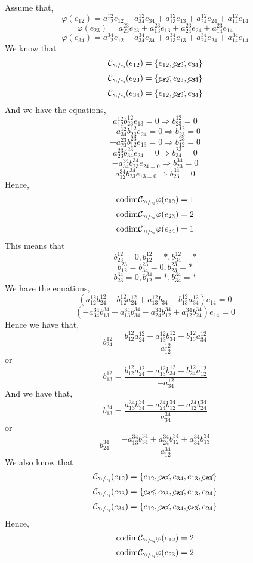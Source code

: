 \documentclass{article}
\begin{document}
Assume that,
\[\varphi(e_{12})= a_{12}^{12}e_{12}+a_{34}^{12}e_{34}+a_{13}^{12}e_{13}+a_{24}^{12}e_{24}+a_{14}^{12}e_{14}\]
\[\varphi(e_{23})= a_{23}^{23}e_{23}+a_{13}^{23}e_{13}+a_{24}^{23}e_{24}+a_{14}^{23}e_{14}\]
\[\varphi(e_{34})= a_{12}^{34}e_{12}+a_{34}^{34}e_{34}+a_{13}^{34}e_{13}+a_{24}^{34}e_{24}+a_{14}^{34}e_{14}\]
We know that
\[\mathcal{C}_{\sfrac{\gamma_1}{\gamma_3}}(e_{12})=\{e_{12},\cancel{e_{23}},e_{34}\}\]
\[\mathcal{C}_{\sfrac{\gamma_1}{\gamma_3}}(e_{23})=\{\cancel{e_{12}},e_{23},\cancel{e_{34}}\}\]
\[\mathcal{C}_{\sfrac{\gamma_1}{\gamma_3}}(e_{34})=\{e_{12},\cancel{e_{23}},e_{34}\}\]
And we have the equations,
\[a_{12}^{12}b_{23}^{12}e_{13}=0\Rightarrow b_{23}^{12}=0\]
\[-a_{34}^{12}b_{23}^{12}e_{24}=0\Rightarrow b_{23}^{12}=0\]
\[-a_{23}^{23}b_{12}^{23}e_{13}=0\Rightarrow b_{12}^{23}=0\]
\[a_{23}^{23}b_{34}^{23}e_{24}=0\Rightarrow b_{34}^{23}=0\]
\[-a_{34}^{34}b_{23}^{34}e_{24=0}\Rightarrow b_{23}^{34}=0\]
\[a_{12}^{34}b_{23}^{34}e_{13=0}\Rightarrow b_{23}^{34}=0\]
Hence,
\[\mathrm{codim}\mathcal{C}_{\sfrac{\gamma_1}{\gamma_3}}\varphi(e_{12})=1\]
\[\mathrm{codim}\mathcal{C}_{\sfrac{\gamma_1}{\gamma_3}}\varphi(e_{23})=2\]
\[\mathrm{codim}\mathcal{C}_{\sfrac{\gamma_1}{\gamma_3}}\varphi(e_{34})=1\]
This means that
\[ b_{23}^{12}=0, b_{12}^{12}=*, b_{34}^{12}=*\]
\[ b_{12}^{23}= b_{34}^{23}=0, b_{23}^{23}=*\]
\[ b_{23}^{34}=0, b_{12}^{34}=*, b_{34}^{34}=*\]
We have the equations,
\[( a_{12}^{12}b_{24}^{12}- b_{12}^{12}a_{24}^{12}+a_{13}^{12}b_{34}-b_{13}^{12}a_{34}^{12})e_{14}=0\]
\[(-a_{34}^{34}b_{13}^{34}+a_{13}^{34}b_{34}^{34}-a_{24}^{34}b_{12}^{34}+a_{12}^{34}b_{24}^{34})e_{14}=0\]
Hence we have that,
\[b_{24}^{12}=\frac{ b_{12}^{12}a_{24}^{12}-a_{13}^{12}b_{34}^{12}+b_{13}^{12}a_{34}^{12}}{ a_{12}^{12}}\] or \[b_{13}^{12}=\frac{ b_{12}^{12}a_{24}^{12}-a_{13}^{12}b_{34}^{12}-b_{24}^{12}a_{12}^{12}}{-a_{34}^{12}}\]
And we have that,
\[b_{13}^{34}=\frac{a_{13}^{34}b_{34}^{34}-a_{24}^{34}b_{12}^{34}+a_{12}^{34}b_{24}^{34}}{a_{34}^{34}}\]
or
\[b_{24}^{34}=\frac{-a_{13}^{34}b_{34}^{34}+a_{24}^{34}b_{12}^{34}+a_{34}^{34}b_{13}^{34}}{a_{12}^{34}}\]
We also know that
\[\mathcal{C}_{\sfrac{\gamma_1}{\gamma_4}}(e_{12})=\{e_{12},\cancel{e_{23}},e_{34},e_{13},\cancel{e_{24}}\}\]
\[\mathcal{C}_{\sfrac{\gamma_1}{\gamma_4}}(e_{23})=\{\cancel{e_{12}},e_{23},\cancel{e_{34}},e_{13},e_{24}\}\]
\[\mathcal{C}_{\sfrac{\gamma_1}{\gamma_4}}(e_{34})=\{e_{12},\cancel{e_{23}},e_{34},\cancel{e_{13}},e_{24}\}\]
Hence,
\[\mathrm{codim}\mathcal{C}_{\sfrac{\gamma_1}{\gamma_4}}\varphi(e_{12})=2\]
\[\mathrm{codim}\mathcal{C}_{\sfrac{\gamma_1}{\gamma_4}}\varphi(e_{23})=2\]
\end{document}
